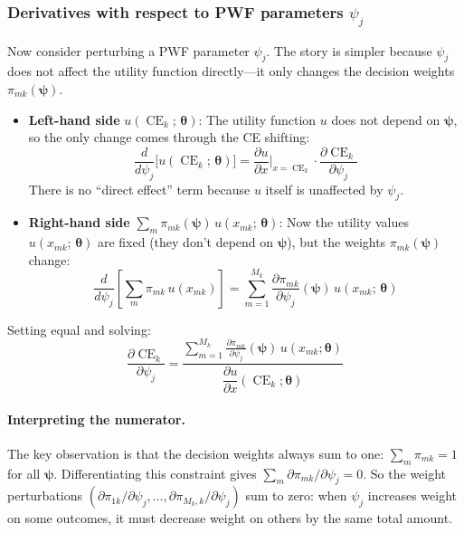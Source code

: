 \documentclass[11pt,a4paper]{article}
\theoremstyle{definition}
\newcommand{\btheta}{\boldsymbol{\theta}}
\newcommand{\bpsi}{\boldsymbol{\psi}}
\DeclareMathOperator{\CE}{CE}
\begin{document}
\subsubsection{Derivatives with respect to PWF parameters $\psi_j$}

Now consider perturbing a PWF parameter $\psi_j$. The story is simpler
because $\psi_j$ does not affect the utility function directly---it only
changes the decision weights $\pi_{mk}(\bpsi)$.

\begin{itemize}
    \item \textbf{Left-hand side} $u(\CE_k;\, \btheta)$: The utility function
    $u$ does not depend on $\bpsi$, so the only change comes through the
    CE shifting:
    \begin{equation}
        \frac{d}{d\psi_j}\!\Big[u(\CE_k;\, \btheta)\Big]
        = \frac{\partial u}{\partial x}\bigg|_{x=\CE_k}
        \cdot \frac{\partial \CE_k}{\partial \psi_j}
    \end{equation}
    There is no ``direct effect'' term because $u$ itself is unaffected by
    $\psi_j$.

    \item \textbf{Right-hand side}
    $\sum_m \pi_{mk}(\bpsi)\, u(x_{mk};\, \btheta)$: Now the utility values
    $u(x_{mk};\, \btheta)$ are fixed (they don't depend on $\bpsi$), but the
    weights $\pi_{mk}(\bpsi)$ change:
    \begin{equation}
        \frac{d}{d\psi_j}\!\left[\sum_m \pi_{mk}\, u(x_{mk})
        \right]
        = \sum_{m=1}^{M_k}
        \frac{\partial \pi_{mk}}{\partial \psi_j}(\bpsi) \, u(x_{mk};\, \btheta)
    \end{equation}
\end{itemize}

Setting equal and solving:
\begin{equation}
    \label{eq:dCE_dpsi}
    \frac{\partial \CE_k}{\partial \psi_j}
    = \frac{
        \displaystyle\sum_{m=1}^{M_k}
        \frac{\partial \pi_{mk}}{\partial \psi_j}(\bpsi) \,
        u(x_{mk}; \btheta)
    }{
        \dfrac{\partial u}{\partial x}(\CE_k; \btheta)
    }
\end{equation}

\paragraph{Interpreting the numerator.}
The key observation is that the decision weights always sum to one:
$\sum_m \pi_{mk} = 1$ for all $\bpsi$. Differentiating this constraint gives
$\sum_m \partial\pi_{mk}/\partial\psi_j = 0$. So the weight perturbations
$(\partial\pi_{1k}/\partial\psi_j, \ldots,
\partial\pi_{M_k,k}/\partial\psi_j)$ sum to zero: when $\psi_j$ increases
weight on some outcomes, it must decrease weight on others by the same total
amount.
\end{document}

